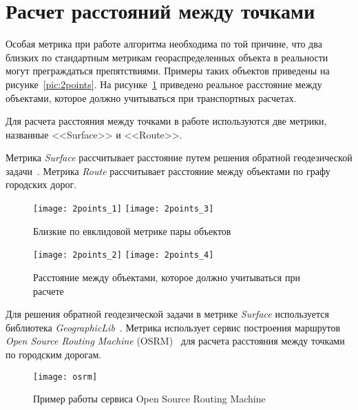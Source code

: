 \section{Расчет расстояний между точками} \label{sec:distance}

Особая метрика при работе алгоритма необходима по той причине, что два близких по стандартным метрикам геораспределенных объекта в реальности могут преграждаться препятствиями. Примеры таких объектов приведены на рисунке~\ref{pic:2points}. На рисунке~\ref{pic:2points-1} приведено реальное расстояние между объектами, которое должно учитываться при транспортных расчетах.

Для расчета расстояния между точками в работе используются две метрики, названные <<Surface>> и <<Route>>.

Метрика \emph{Surface} рассчитывает расстояние путем решения обратной геодезической задачи~\cite[с. 48-50]{geodesic}. Метрика \emph{Route} рассчитывает расстояние между объектами по графу городских дорог.

\begin{figure}[t!]
    \centering
    \texttt{[image: 2points\_1]} \hspace{1ex}
    \texttt{[image: 2points\_3]} \\[.5ex]
    \parbox{.9\textwidth}{\caption{Близкие по евклидовой метрике пары объектов}\label{pic:2points}}
    \texttt{[image: 2points\_2]} \hspace{1ex}
    \texttt{[image: 2points\_4]} \\[.5ex]
    \parbox{.9\textwidth}{\caption{Расстояние между объектами, которое должно учитываться при расчете}\label{pic:2points-1}}
\end{figure}

Для решения обратной геодезической задачи в метрике \emph{Surface} используется библиотека \emph{GeographicLib}~\cite{geographiclib}. Метрика использует сервис построения маршрутов \emph{Open Source Routing Machine} (OSRM)~\cite{OSRM} для расчета расстояния между точками по городским дорогам.

\begin{figure}[b!]
    \centering
    \texttt{[image: osrm]}\\[1ex]
    \parbox{.9\textwidth}{\caption{Пример работы сервиса Open Source Routing Machine}\label{pic:osrm}}
    \vspace*{-1ex}
\end{figure}

